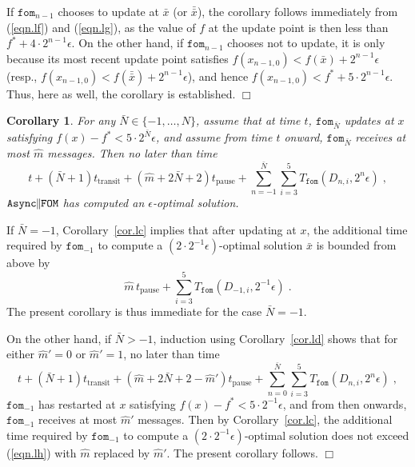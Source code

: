 \documentclass[reqno, 11pt]{amsart}
\newtheorem{cor}[prop]{Corollary}
\numberwithin{equation}{section}
\newcommand{\nt}{\negthinspace}
\newcommand{\fom}{\mathtt{fom}}
\newcommand{\parfom}{\parallel \nt \nt  \mathtt{FOM}}
\newcommand{\tpause}{t_{\mathrm{pause}}}
\newcommand{\ttransit}{t_{\mathrm{transit}}}
\newcommand{\aparfom}{\mathtt{Async} \nt \nt \parfom}
\begin{document}
If $ \fom_{n-1} $ chooses to update at $ \bar{x} $ (or $ \bar{\bar{x}} $), the corollary follows immediately from (\ref{eqn.lf}) and (\ref{eqn.lg}), as the value of $ f $ at the update point is then less than $ f^* + 4 \cdot 2^{n-1} \epsilon $. On the other hand, if $ \fom_{n-1} $ chooses not to update, it is only because its most recent update point satisfies $ f(x_{n-1,0}) < f( \bar{x}) + 2^{n-1} \epsilon $ (resp., $  f(x_{n-1,0}) < f( \bar{\bar{x}}  ) + 2^{n-1} \epsilon $), and hence $ f(x_{n-1,0}) < f^* + 5 \cdot 2^{n-1} \epsilon $. Thus, here as well, the corollary is established. \hfill $ \Box $
   
 \begin{cor}  \label{cor.le} 
For any $ \bar{N} \in \{ -1, \ldots, N \} $, assume that at time $ t $, $ \fom_{\bar{N}} $ updates at $ x $ satisfying $ f(x) - f^* < 5 \cdot 2^{\bar{N}} \epsilon $, and assume from time $ t $ onward, $ \fom_{\bar{N}} $ receives at most $ \hat{m}  $ messages.  Then no later than time
\[  
     t + (\bar{N} +1) \ttransit + ( \hat{m} + 2 \bar{N} + 2) \tpause    + \sum_{n = -1}^{\bar{N}} \sum_{i=3}^5 T_{\fom}(D_{n,i}, 2^n \epsilon ) \; , 
\] 
$ \aparfom $ has computed an $ \epsilon $-optimal solution.
\end{cor}
  If $ \bar{N} = -1 $, Corollary~\ref{cor.lc}  implies that after updating at $ x $, the additional time required by $ \fom_{-1} $ to compute a $ (2 \cdot 2^{-1} \epsilon)  $-optimal solution $ \bar{x} $  is bounded from above by
\begin{equation}  \label{eqn.lh} 
    \hat{m} \, \tpause  + \sum_{i=3}^5 T_{\fom}( D_{-1,i}, 2^{-1} \epsilon ) \; . 
    \end{equation} 
The present corollary is thus immediate for the case $ \bar{N} = -1 $.

On the other hand, if $ \bar{N} > - 1 $, induction using Corollary~\ref{cor.ld}  shows that for either $ \hat{m}' = 0 $ or $ \hat{m}' = 1 $,   no later than time
\[     
   t +  (\bar{N}+1) \ttransit + (\hat{m} + 2\bar{N} + 2 - \hat{m}' ) \tpause   + \sum_{n=0}^{\bar{N}} \sum_{i=3}^5 T_{\fom}( D_{n,i}, 2^n \epsilon ) \; , 
\] 
$ \fom_{-1} $ has restarted at $ x $ satisfying $ f(x) - f^* < 5 \cdot 2^{-1} \epsilon $, and from then onwards, $ \fom_{-1} $ receives at most  $ \hat{m}' $ messages.  Then by Corollary~\ref{cor.lc}, the additional time required by $ \fom_{-1} $ to compute a $ (2 \cdot 2^{-1} \epsilon) $-optimal solution does not exceed (\ref{eqn.lh})  with $ \hat{m} $ replaced by $ \hat{m}' $. The present corollary follows.  \hfill $ \Box $
\vspace{2mm}
\end{document}
